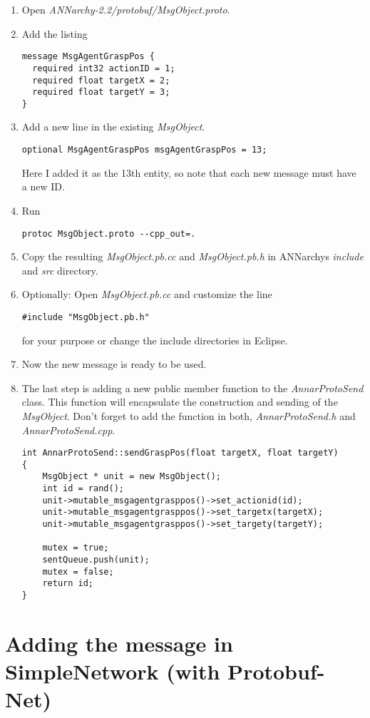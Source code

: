 \documentclass[a4paper,11pt,oneside,pdftex]{scrartcl}
\begin{document}
\begin{enumerate}
 \item Open \emph{ANNarchy-2.2/protobuf/MsgObject.proto}.
 \item Add the listing
\begin{lstlisting}
message MsgAgentGraspPos {
  required int32 actionID = 1;
  required float targetX = 2;
  required float targetY = 3;
}
\end{lstlisting}
 \item Add a new line in the existing \emph{MsgObject}.
\begin{lstlisting}
optional MsgAgentGraspPos msgAgentGraspPos = 13;
\end{lstlisting}
Here I added it as the 13th entity, so note that each new message must have a new ID.
\item Run \begin{lstlisting}
protoc MsgObject.proto --cpp_out=.
\end{lstlisting}
 \item Copy the resulting \emph{MsgObject.pb.cc} and \emph{MsgObject.pb.h} in ANNarchys \emph{include}
and \emph{src} directory.
\item Optionally: Open \emph{MsgObject.pb.cc} and customize the line 
\begin{lstlisting}
#include "MsgObject.pb.h"
\end{lstlisting}
for your purpose or change the include directories in Eclipse.
\item Now the new message is ready to be used.


\item The last step is adding a new public member function to the \emph{AnnarProtoSend} class. This function
will encapsulate the construction and sending of the \emph{MsgObject}.
Don't forget to add the function in both, \emph{AnnarProtoSend.h} and \emph{AnnarProtoSend.cpp}.
\begin{lstlisting}
int AnnarProtoSend::sendGraspPos(float targetX, float targetY)
{
	MsgObject * unit = new MsgObject();
	int id = rand();
	unit->mutable_msgagentgrasppos()->set_actionid(id);
	unit->mutable_msgagentgrasppos()->set_targetx(targetX);
	unit->mutable_msgagentgrasppos()->set_targety(targetY);

	mutex = true;
	sentQueue.push(unit);
	mutex = false;
	return id;
}
\end{lstlisting}
\end{enumerate}
\section{Adding the message in SimpleNetwork (with Protobuf-Net)}
\end{document}
